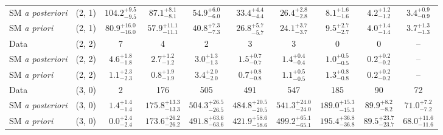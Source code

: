 \begin{table}[h!]
{\begin{tabular}{lccccccccc}
    SM {\it a posteriori} & (2, 1)           & $104.2^{+ 9.5 }_{- 9.5 }$     & $87.1^{+ 8.1 }_{- 8.1 }$      & $54.9^{+ 6.0 }_{- 6.0 }$    & $33.4^{+ 4.4 }_{- 4.4 }$    & $26.4^{+ 2.8 }_{- 2.8 }$    & $8.1^{+ 1.6 }_{- 1.6 }$     & $4.2^{+ 1.2 }_{- 1.2 }$    & $3.4^{+ 0.9 }_{- 0.9 }$    \\[0.5ex] 
    SM {\it a priori}     & (2, 1)           & $80.9^{+ 16.0 }_{- 16.0 }$    & $57.9^{+ 11.1 }_{- 11.1 }$    & $40.8^{+ 7.3 }_{- 7.3 }$    & $26.8^{+ 5.7 }_{- 5.7 }$    & $24.1^{+ 3.7 }_{- 3.7 }$    & $9.5^{+ 2.7 }_{- 2.7 }$     & $4.0^{+ 1.4 }_{- 1.4 }$    & $3.7^{+ 1.3 }_{- 1.3 }$    \\[0.5ex] 
    Data                  & (2, 2)           & 7                             & 4                             & 2                           & 3                           & 3                           & 0                           & 0                          & --                         \\[0.5ex] 
    SM {\it a posteriori} & (2, 2)           & $4.6^{+ 1.8 }_{- 1.8 }$       & $2.7^{+ 1.2 }_{- 1.2 }$       & $3.0^{+ 1.3 }_{- 1.3 }$     & $1.5^{+ 0.7 }_{- 0.7 }$     & $1.4^{+ 0.4 }_{- 0.4 }$     & $1.0^{+ 0.5 }_{- 0.5 }$     & $0.2^{+ 0.2 }_{- 0.2 }$    & --                         \\[0.5ex] 
    SM {\it a priori}     & (2, 2)           & $1.1^{+ 2.3 }_{- 2.3 }$       & $0.8^{+ 1.9 }_{- 1.9 }$       & $3.4^{+ 2.0 }_{- 2.0 }$     & $0.7^{+ 0.8 }_{- 0.8 }$     & $1.1^{+ 0.5 }_{- 0.5 }$     & $1.3^{+ 0.8 }_{- 0.8 }$     & $0.2^{+ 0.2 }_{- 0.2 }$    & --                         \\[0.5ex] 
    Data                  & (3, 0)           & 2                             & 176                           & 505                         & 491                         & 547                         & 185                         & 90                         & 72                         \\[0.5ex] 
    SM {\it a posteriori} & (3, 0)           & $1.4^{+ 1.4 }_{- 1.4 }$       & $175.8^{+ 13.3 }_{- 13.3 }$   & $504.3^{+ 26.5 }_{- 26.5 }$ & $484.8^{+ 20.5 }_{- 20.5 }$ & $541.3^{+ 24.0 }_{- 24.0 }$ & $189.0^{+ 15.3 }_{- 15.3 }$ & $89.9^{+ 8.2 }_{- 8.2 }$   & $71.0^{+ 7.2 }_{- 7.2 }$   \\[0.5ex] 
    SM {\it a priori}     & (3, 0)           & $0.0^{+ 2.4 }_{- 2.4 }$       & $173.6^{+ 26.2 }_{- 26.2 }$   & $491.8^{+ 63.6 }_{- 63.6 }$ & $421.9^{+ 58.6 }_{- 58.6 }$ & $499.2^{+ 65.1 }_{- 65.1 }$ & $195.4^{+ 36.8 }_{- 36.8 }$ & $89.5^{+ 23.7 }_{- 23.7 }$ & $68.0^{+ 11.6 }_{- 11.6 }$ \\[0.5ex] 

\end{tabular}}
\end{table}
